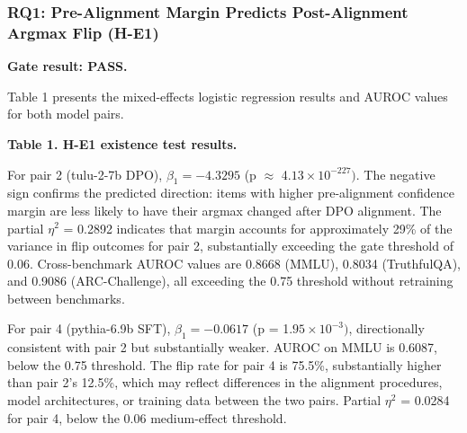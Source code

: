 
\subsubsection{RQ1: Pre-Alignment Margin Predicts Post-Alignment Argmax Flip (H-E1)}

\textbf{Gate result: PASS.}

Table 1 presents the mixed-effects logistic regression results and AUROC values for both model pairs.

\textbf{Table 1. H-E1 existence test results.}

\begin{table}[htbp]
\centering
{}
\end{table}

For pair 2 (tulu-2-7b DPO), $\beta _1 = -4.3295$ (p $\approx$ 4.$13\times 10^{-227})$. The negative sign confirms the predicted direction: items with higher pre-alignment confidence margin are less likely to have their argmax changed after DPO alignment. The partial $\eta^2$ = 0.2892 indicates that margin accounts for approximately 29\% of the variance in flip outcomes for pair 2, substantially exceeding the gate threshold of 0.06. Cross-benchmark AUROC values are 0.8668 (MMLU), 0.8034 (TruthfulQA), and 0.9086 (ARC-Challenge), all exceeding the 0.75 threshold without retraining between benchmarks.

For pair 4 (pythia-6.9b SFT), $\beta _1 = -0.0617$ (p = 1.$95\times 10^{-3})$, directionally consistent with pair 2 but substantially weaker. AUROC on MMLU is 0.6087, below the 0.75 threshold. The flip rate for pair 4 is 75.5\%, substantially higher than pair 2's 12.5\%, which may reflect differences in the alignment procedures, model architectures, or training data between the two pairs. Partial $\eta^2$ = 0.0284 for pair 4, below the 0.06 medium-effect threshold.

